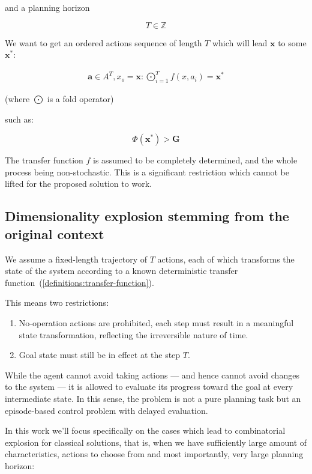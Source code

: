 \documentclass[11pt, a4paper]{article}
\begin{document}
	and a planning horizon
	
	\begin{equation}
		T \in \mathbb{Z}
	\end{equation}
	
	We want to get an ordered actions sequence of length $T$ which will lead $\mathbf{x}$ to some $\mathbf{x}^*$:
	
	\begin{eqnarray}\label{definitions:fold}
		\mathbf{a} \in A^T, x_o = \mathbf{x}: \bigodot_{i=1}^{T} f(x, a_i) = \mathbf{x}^*
	\end{eqnarray}
	
	(where $\bigodot$ is a fold operator)
	
	such as:
	
	\begin{equation}
		\Phi(\mathbf{x}^*) > \mathbf{G}
	\end{equation}
	
	The transfer function $f$ is assumed to be completely determined, and the whole process being non-stochastic. This is a significant restriction which cannot be lifted for the proposed solution to work.

	\subsection{Dimensionality explosion stemming from the original context}

	We assume a fixed-length trajectory of $𝑇$ actions, each of which transforms the state of the system according to a known deterministic transfer function~(\ref{definitions:transfer-function}).

	This means two restrictions:
	
	\begin{enumerate}
		\item No-operation actions are prohibited, each step must result in a meaningful state transformation, reflecting the irreversible nature of time.
		\item Goal state must still be in effect at the step $T$.
	\end{enumerate}

	While the agent cannot avoid taking actions — and hence cannot avoid changes to the system — it is allowed to evaluate its progress toward the goal at every intermediate state.
	In this sense, the problem is not a pure planning task but an episode-based control problem with delayed evaluation.
	
	In this work we'll focus specifically on the cases which lead to combinatorial explosion for classical solutions, that is, when we have sufficiently large amount of characteristics, actions to choose from and most importantly, very large planning horizon:
	
\end{document}
